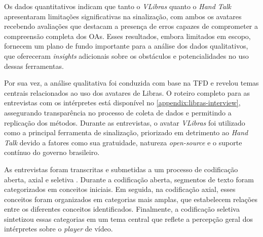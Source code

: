 Os dados quantitativos indicam que tanto o \textit{VLibras} quanto o \textit{Hand Talk} apresentaram limitações significativas na sinalização, com ambos os avatares recebendo avaliações que destacam a presença de erros capazes de comprometer a compreensão completa dos OAs. Esses resultados, embora limitados em escopo, fornecem um plano de fundo importante para a análise dos dados qualitativos, que ofereceram \textit{insights} adicionais sobre os obstáculos e potencialidades no uso dessas ferramentas.

Por sua vez, a análise qualitativa foi conduzida com base na TFD e revelou temas centrais relacionados ao uso dos avatares de Libras. O roteiro completo para as entrevistas com os intérpretes está disponível no \autoref{appendix:libras-interview}, assegurando transparência no processo de coleta de dados e permitindo a replicação dos métodos. Durante as entrevistas, o avatar \textit{VLibras} foi utilizado como a principal ferramenta de sinalização, priorizado em detrimento ao \textit{Hand Talk} devido a fatores como sua gratuidade, natureza \textit{open-source} e o suporte contínuo do governo brasileiro. %



As entrevistas foram transcritas e submetidas a um processo de codificação aberta, axial e seletiva \cite{Charmaz2009}. Durante a codificação aberta, segmentos de texto foram categorizados em conceitos iniciais. Em seguida, na codificação axial, esses conceitos foram organizados em categorias mais amplas, que estabelecem relações entre os diferentes conceitos identificados. Finalmente, a codificação seletiva sintetizou essas categorias em um tema central que reflete a percepção geral dos intérpretes sobre o \textit{player} de vídeo.

